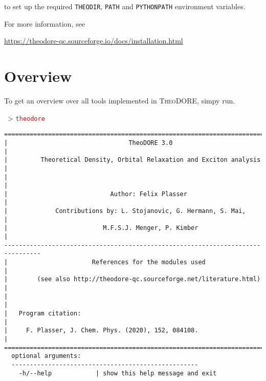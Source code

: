 \documentclass[DIV=12,headings=normal]{scrartcl}
\newcommand{\redl}[1]{{\textcolor{red}{\texttt{#1}}}}
\newcommand{\comm}[1]{
\small
~> \redl{#1}
\normalsize
}
\newcommand{\theo}{\textsc{TheoDORE}}
\begin{document}
to set up the required \texttt{THEODIR}, \texttt{PATH} and \texttt{PYTHONPATH} environment variables.

For more information, see

\url{https://theodore-qc.sourceforge.io/docs/installation.html}

\clearpage
\section{Overview}
To get an overview over all tools implemented in \theo{}, simpy run.

\comm{theodore}

\scriptsize
\begin{Verbatim}[commandchars=\\\{\}]
================================================================================
|                                 TheoDORE 3.0                                 |
|         Theoretical Density, Orbital Relaxation and Exciton analysis         |
|                                                                              |
|                            Author: Felix Plasser                             |
|             Contributions by: L. Stojanovic, G. Hermann, S. Mai,             |
|                          M.F.S.J. Menger, P. Kimber                          |
--------------------------------------------------------------------------------
|                       References for the modules used                        |
|        (see also http://theodore-qc.sourceforge.net/literature.html)         |
|                                                                              |
|   Program citation:                                                          |
|     F. Plasser, J. Chem. Phys. (2020), 152, 084108.                          |
================================================================================
  optional arguments:
  ---------------------------------------------------
    -h/--help            | show this help message and exit                   


\end{Verbatim}
\end{document}
